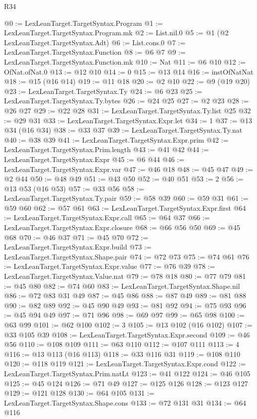 \begin{lexlean}{R34}
\begin{coremodule}
@0 := LexLeanTarget.TargetSyntax.Program
@1 := LexLeanTarget.TargetSyntax.Program.mk
@2 := List.nil.{0}
@5 := @1 (@2 LexLeanTarget.TargetSyntax.Adt)
@6 := List.cons.{0}
@7 := LexLeanTarget.TargetSyntax.Function
@8 := @6 @7
@9 := LexLeanTarget.TargetSyntax.Function.mk
@10 := Nat
@11 := @6 @10
@12 := OfNat.ofNat.{0}
@13 := @12 @10
@14 := 0
@15 := @13 @14
@16 := instOfNatNat
@18 := @15 (@16 @14)
@19 := @11 @18
@20 := @2 @10
@22 := @9 (@19 @20)
@23 := LexLeanTarget.TargetSyntax.Ty
@24 := @6 @23
@25 := LexLeanTarget.TargetSyntax.Ty.bytes
@26 := @24 @25
@27 := @2 @23
@28 := @26 @27
@29 := @22 @28
@31 := LexLeanTarget.TargetSyntax.Ty.list @25
@32 := @29 @31
@33 := LexLeanTarget.TargetSyntax.Expr.let
@34 := 1
@37 := @13 @34 (@16 @34)
@38 := @33 @37
@39 := LexLeanTarget.TargetSyntax.Ty.nat
@40 := @38 @39
@41 := LexLeanTarget.TargetSyntax.Expr.prim
@42 := LexLeanTarget.TargetSyntax.Prim.length
@43 := @41 @42
@44 := LexLeanTarget.TargetSyntax.Expr
@45 := @6 @44
@46 := LexLeanTarget.TargetSyntax.Expr.var
@47 := @46 @18
@48 := @45 @47
@49 := @2 @44
@50 := @48 @49
@51 := @43 @50
@52 := @40 @51
@53 := 2
@56 := @13 @53 (@16 @53)
@57 := @33 @56
@58 := LexLeanTarget.TargetSyntax.Ty.pair
@59 := @58 @39
@60 := @59 @31
@61 := @59 @60
@62 := @57 @61
@63 := LexLeanTarget.TargetSyntax.Expr.first
@64 := LexLeanTarget.TargetSyntax.Expr.call
@65 := @64 @37
@66 := LexLeanTarget.TargetSyntax.Expr.closure
@68 := @66 @56 @50
@69 := @45 @68
@70 := @46 @37
@71 := @45 @70
@72 := LexLeanTarget.TargetSyntax.Expr.build
@73 := LexLeanTarget.TargetSyntax.Shape.pair
@74 := @72 @73
@75 := @74 @61
@76 := LexLeanTarget.TargetSyntax.Expr.value
@77 := @76 @39
@78 := LexLeanTarget.TargetSyntax.Value.nat
@79 := @78 @18
@80 := @77 @79
@81 := @45 @80
@82 := @74 @60
@83 := LexLeanTarget.TargetSyntax.Shape.nil
@86 := @72 @83 @31 @49
@87 := @45 @86
@88 := @87 @49
@89 := @81 @88
@90 := @82 @89
@92 := @45 @90 @49
@93 := @81 @92
@94 := @75 @93
@96 := @45 @94 @49
@97 := @71 @96
@98 := @69 @97
@99 := @65 @98
@100 := @63 @99
@101 := @62 @100
@102 := 3
@105 := @13 @102 (@16 @102)
@107 := @33 @105 @39
@108 := LexLeanTarget.TargetSyntax.Expr.second
@109 := @46 @56
@110 := @108 @109
@111 := @63 @110
@112 := @107 @111
@113 := 4
@116 := @13 @113 (@16 @113)
@118 := @33 @116 @31
@119 := @108 @110
@120 := @118 @119
@121 := LexLeanTarget.TargetSyntax.Expr.cond
@122 := LexLeanTarget.TargetSyntax.Prim.natLt
@123 := @41 @122
@124 := @46 @105
@125 := @45 @124
@126 := @71 @49
@127 := @125 @126
@128 := @123 @127
@129 := @121 @128
@130 := @64 @105
@131 := LexLeanTarget.TargetSyntax.Shape.cons
@133 := @72 @131 @31
@134 := @64 @116

\end{coremodule}
\end{lexlean}
